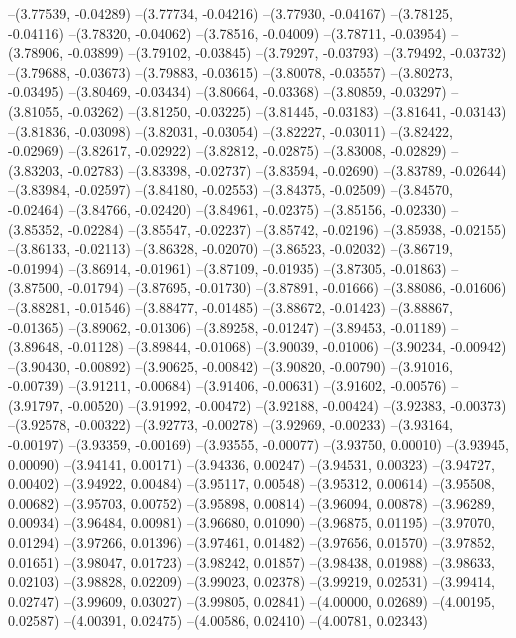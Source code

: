 --(3.77539, -0.04289)
--(3.77734, -0.04216)
--(3.77930, -0.04167)
--(3.78125, -0.04116)
--(3.78320, -0.04062)
--(3.78516, -0.04009)
--(3.78711, -0.03954)
--(3.78906, -0.03899)
--(3.79102, -0.03845)
--(3.79297, -0.03793)
--(3.79492, -0.03732)
--(3.79688, -0.03673)
--(3.79883, -0.03615)
--(3.80078, -0.03557)
--(3.80273, -0.03495)
--(3.80469, -0.03434)
--(3.80664, -0.03368)
--(3.80859, -0.03297)
--(3.81055, -0.03262)
--(3.81250, -0.03225)
--(3.81445, -0.03183)
--(3.81641, -0.03143)
--(3.81836, -0.03098)
--(3.82031, -0.03054)
--(3.82227, -0.03011)
--(3.82422, -0.02969)
--(3.82617, -0.02922)
--(3.82812, -0.02875)
--(3.83008, -0.02829)
--(3.83203, -0.02783)
--(3.83398, -0.02737)
--(3.83594, -0.02690)
--(3.83789, -0.02644)
--(3.83984, -0.02597)
--(3.84180, -0.02553)
--(3.84375, -0.02509)
--(3.84570, -0.02464)
--(3.84766, -0.02420)
--(3.84961, -0.02375)
--(3.85156, -0.02330)
--(3.85352, -0.02284)
--(3.85547, -0.02237)
--(3.85742, -0.02196)
--(3.85938, -0.02155)
--(3.86133, -0.02113)
--(3.86328, -0.02070)
--(3.86523, -0.02032)
--(3.86719, -0.01994)
--(3.86914, -0.01961)
--(3.87109, -0.01935)
--(3.87305, -0.01863)
--(3.87500, -0.01794)
--(3.87695, -0.01730)
--(3.87891, -0.01666)
--(3.88086, -0.01606)
--(3.88281, -0.01546)
--(3.88477, -0.01485)
--(3.88672, -0.01423)
--(3.88867, -0.01365)
--(3.89062, -0.01306)
--(3.89258, -0.01247)
--(3.89453, -0.01189)
--(3.89648, -0.01128)
--(3.89844, -0.01068)
--(3.90039, -0.01006)
--(3.90234, -0.00942)
--(3.90430, -0.00892)
--(3.90625, -0.00842)
--(3.90820, -0.00790)
--(3.91016, -0.00739)
--(3.91211, -0.00684)
--(3.91406, -0.00631)
--(3.91602, -0.00576)
--(3.91797, -0.00520)
--(3.91992, -0.00472)
--(3.92188, -0.00424)
--(3.92383, -0.00373)
--(3.92578, -0.00322)
--(3.92773, -0.00278)
--(3.92969, -0.00233)
--(3.93164, -0.00197)
--(3.93359, -0.00169)
--(3.93555, -0.00077)
--(3.93750, 0.00010)
--(3.93945, 0.00090)
--(3.94141, 0.00171)
--(3.94336, 0.00247)
--(3.94531, 0.00323)
--(3.94727, 0.00402)
--(3.94922, 0.00484)
--(3.95117, 0.00548)
--(3.95312, 0.00614)
--(3.95508, 0.00682)
--(3.95703, 0.00752)
--(3.95898, 0.00814)
--(3.96094, 0.00878)
--(3.96289, 0.00934)
--(3.96484, 0.00981)
--(3.96680, 0.01090)
--(3.96875, 0.01195)
--(3.97070, 0.01294)
--(3.97266, 0.01396)
--(3.97461, 0.01482)
--(3.97656, 0.01570)
--(3.97852, 0.01651)
--(3.98047, 0.01723)
--(3.98242, 0.01857)
--(3.98438, 0.01988)
--(3.98633, 0.02103)
--(3.98828, 0.02209)
--(3.99023, 0.02378)
--(3.99219, 0.02531)
--(3.99414, 0.02747)
--(3.99609, 0.03027)
--(3.99805, 0.02841)
--(4.00000, 0.02689)
--(4.00195, 0.02587)
--(4.00391, 0.02475)
--(4.00586, 0.02410)
--(4.00781, 0.02343)
